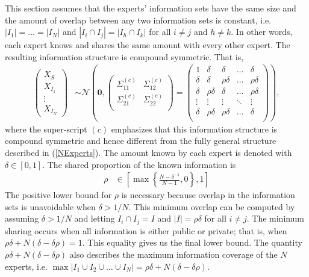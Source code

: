 \documentclass[11pt,twoside]{article}
\theoremstyle{definition}
\theoremstyle{definition}
\begin{document}
This section assumes that the experts' information sets have the same size and the amount of overlap between any two information sets is constant, i.e.  $|I_{1}| =  \dots = |I_{N}|$ and $|I_{i} \cap I_{j}| = |I_{h} \cap I_{k}|$ for all $i \neq j$ and $h \neq k$. In other words, each expert knows and shares the same amount with every other expert. The resulting information structure is compound symmetric. That is,
\begin{align*}
\left(\begin{matrix} X_{S} \\ X_{I_1}\\ \vdots \\ X_{I_N} \end{matrix}\right) &\sim \mathcal{N}\left( 
 \boldsymbol{0}, \left(\begin{matrix} 
\Sigma_{11}^{(c)} & \Sigma_{12}^{(c)}\\
\Sigma_{21}^{(c)} & \Sigma_{22}^{(c)}\\
 \end{matrix}\right) 
 =
 \left(\begin{array}{c|cccc}
1 & \delta & \delta & \dots & \delta  \\ \hline
\delta & \delta &\rho\delta & \dots & \rho\delta   \\ 
\delta & \rho\delta & \delta & \dots & \rho\delta  \\ 
\vdots & \vdots & \vdots & \ddots & \vdots  \\ 
\delta & \rho\delta & \rho\delta & \dots & \delta\\ 
 \end{array}\right)\right),
\end{align*}
where the super-script $(c)$ emphasizes that this information structure is compound symmetric and hence different from the fully general structure described in (\ref{NExperts}). The amount known by each expert is denoted with $\delta \in [0,1]$. The shared proportion of the known information is 
\begin{align}
\rho &\in \left[  \max \left\{ \frac{N-\delta^{-1}}{N-1}, 0\right\}, 1 \right] \label{rhoDomain}
\end{align}
The positive lower bound for $\rho$ is necessary because overlap in the information sets is unavoidable when $\delta > 1/N$. This minimum overlap can be computed by assuming $\delta > 1/N$ and letting $I_{i} \cap I_j = I$ and $|I| =  \rho \delta$ for all $i \neq j$. The minimum sharing occurs when all information is either public or private; that is, when $\rho\delta + N(\delta - \delta\rho) = 1$. This equality gives us the final lower bound. The quantity  $\rho\delta + N(\delta - \delta\rho)$ also describes the maximum information coverage of the $N$ experts, i.e. $\max | I_1 \cup I_2 \cup \dots \cup I_N| = \rho\delta + N(\delta - \delta\rho)$. 
\end{document}
